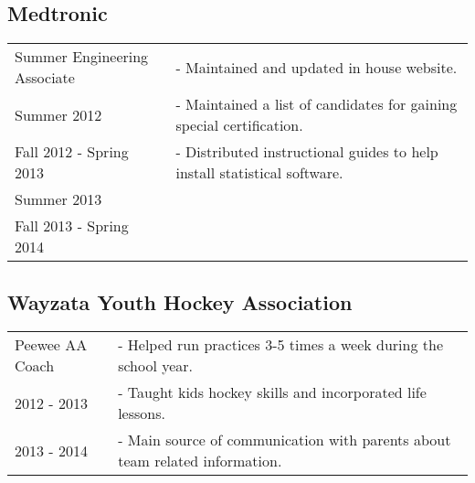 \documentclass{article}[11pt]
\begin{document}
	\subsection*{Medtronic}
	\noindent
	\begin{tabular}{@{}p{5cm}l}
	\noindent Summer Engineering Associate 	& - Maintained and updated in house website.\\
	Summer 2012 			& - Maintained a list of candidates for gaining special certification. \\
	Fall 2012 - Spring 2013 	& - Distributed instructional guides to help install statistical software. \\
	Summer 2013 			& \\
	Fall 2013 - Spring 2014	&
	\end{tabular}
	\hfill
	\subsection*{Wayzata Youth Hockey Association}
	\begin{tabular}{@{}p{5cm}l}
	Peewee AA Coach 		& - Helped run practices 3-5 times a week during the school year. \\
	2012 - 2013 	& - Taught kids hockey skills and incorporated life lessons. \\
	2013 - 2014 	& - Main source of communication with parents about team related information.
	\end{tabular}
\end{document}
